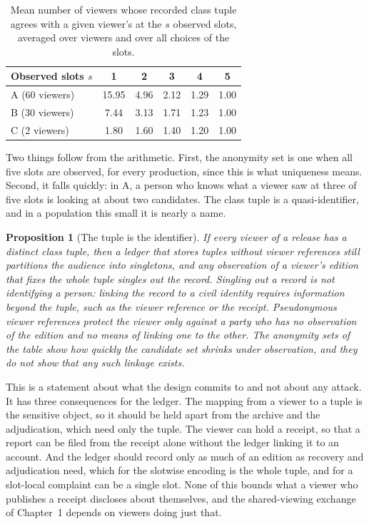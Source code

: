 \documentclass[11pt,twoside,openright]{book}
\theoremstyle{plain}
\newtheorem{proposition}[theorem]{Proposition}
\theoremstyle{definition}
\theoremstyle{remark}
\begin{document}
\begin{table}[ht]
\centering
\begin{tabular}{@{}lccccc@{}}
\toprule
Observed slots $s$ & 1 & 2 & 3 & 4 & 5\\
\midrule
A (60 viewers) & 15.95 & 4.96 & 2.12 & 1.29 & 1.00\\
B (30 viewers) & 7.44 & 3.13 & 1.71 & 1.23 & 1.00\\
C (2 viewers) & 1.80 & 1.60 & 1.40 & 1.20 & 1.00\\
\bottomrule
\end{tabular}
\caption{Mean number of viewers whose recorded class tuple agrees with a given viewer's at the $s$ observed slots, averaged over viewers and over all choices of the slots.}\label{tab:anon12}
\end{table}

Two things follow from the arithmetic. First, the anonymity set is one when all five slots are observed, for every production, since this is what uniqueness means. Second, it falls quickly: in A, a person who knows what a viewer saw at three of five slots is looking at about two candidates. The class tuple is a quasi-identifier, and in a population this small it is nearly a name.

\begin{proposition}[The tuple is the identifier]\label{prop:ident}
If every viewer of a release has a distinct class tuple, then a ledger that stores tuples without viewer references still partitions the audience into singletons, and any observation of a viewer's edition that fixes the whole tuple singles out the record. Singling out a record is not identifying a person: linking the record to a civil identity requires information beyond the tuple, such as the viewer reference or the receipt. Pseudonymous viewer references protect the viewer only against a party who has no observation of the edition and no means of linking one to the other. The anonymity sets of the table show how quickly the candidate set shrinks under observation, and they do not show that any such linkage exists.
\end{proposition}

This is a statement about what the design commits to and not about any attack. It has three consequences for the ledger. The mapping from a viewer to a tuple is the sensitive object, so it should be held apart from the archive and the adjudication, which need only the tuple. The viewer can hold a receipt, so that a report can be filed from the receipt alone without the ledger linking it to an account. And the ledger should record only as much of an edition as recovery and adjudication need, which for the slotwise encoding is the whole tuple, and for a slot-local complaint can be a single slot. None of this bounds what a viewer who publishes a receipt discloses about themselves, and the shared-viewing exchange of Chapter~1 depends on viewers doing just that.
\end{document}
